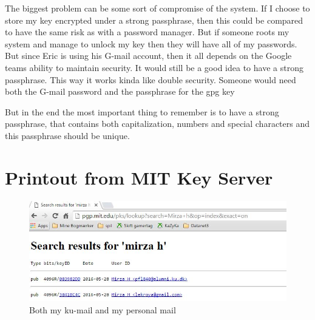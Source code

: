 \documentclass{sig-alternate-05-2015}
\begin{document}
The biggest problem can be some sort of compromise of the system. If I choose to store my key encrypted under a strong passphrase, then this could be compared to have the same risk as with a password manager. But if someone roots my system and manage to unlock my key then they will have all of my passwords. But since Eric is using his G-mail account, then it all depends on the Google teams ability to maintain security. It would still be a good idea to have a strong passphrase. This way it works kinda like double security. Someone would need both the G-mail password and the passphrase for the gpg key

But in the end the most important thing to remember is to have a strong passphrase, that contains both capitalization, numbers and special characters and this passphrase should be unique.

\newpage
\onecolumn
\appendix
\section{Printout from MIT Key Server}
\begin{figure}[H]
  \centering
  \includegraphics[scale=1]{MITKEY.jpg}
  \caption{Both my ku-mail and my personal mail}
\end{figure}
\newpage
\end{document}
